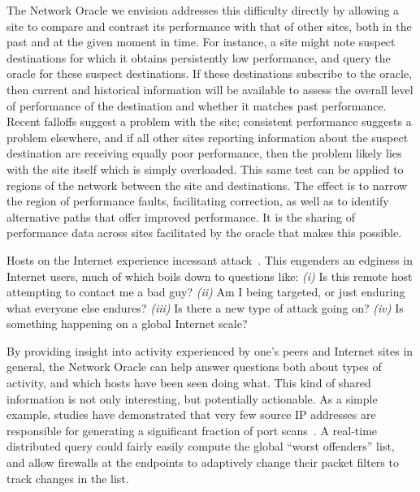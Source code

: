 \documentclass[twocolumn,10pt]{article}
\newcommand{\note}[1]{}
\def\Sys{Network Oracle\xspace}
\begin{document}
The \Sys we envision addresses this difficulty directly by
allowing a site to compare and contrast its performance with that of
other sites, both in the past and at the given moment in time. For
instance, a site might note suspect destinations for which it obtains
persistently low performance, and query the oracle for these suspect
destinations. If these destinations subscribe to the oracle, then
current and historical information will be available to assess the
overall level of performance of the destination and whether it matches
past performance.  Recent falloffs suggest a problem with the site;
consistent performance suggests a problem elsewhere, and if all other
sites reporting information about the suspect destination are
receiving equally poor performance, then the problem likely lies with
the site itself which is simply overloaded. This same test can be
applied to regions of the network between the site and
destinations. The effect is to narrow the region of performance
faults, facilitating correction, as well as to identify alternative
paths that offer improved performance. It is the sharing of
performance data across sites facilitated by the oracle that makes
this possible.

\vspace{1em}
\note{Paxson} Hosts on the Internet experience incessant
attack~\cite{pang_imc_2004}. This engenders an edginess in Internet
users, much of which boils down to questions like: 
	\emph{(i)} Is this remote host attempting to contact me a bad guy?
	\emph{(ii)} Am I being targeted, or just enduring what everyone else endures?
	\emph{(iii)} Is there a new type of attack going on?
	\emph{(iv)} Is something happening on a global Internet scale?

By providing insight into activity experienced by one's peers and
Internet sites in general, the \Sys can help answer questions both
about types of activity, and which hosts have been seen doing what.
This kind of shared information is not only interesting, but
potentially actionable.  As a simple example, studies have
demonstrated that very few source IP addresses are responsible for generating a
significant fraction of port scans~\cite{yegneswaran-sigmetrics03}.  A
real-time distributed query could fairly easily compute the global
``worst offenders'' list, and allow firewalls at the endpoints to
adaptively change their packet filters to track changes in the list.
\end{document}
